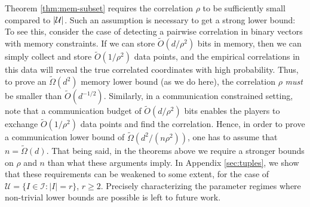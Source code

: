 \begin{remark}\label{remark:rhosmall}
Theorem \ref{thm:mem-subset} requires the correlation $\rho$ to be sufficiently small compared to $|\mathcal{U}|$. Such an assumption is necessary to get a strong lower bound: To see this, consider the case of detecting a pairwise correlation in binary vectors with memory constraints. If we can store $\tilde{O}(d/\rho^2)$ bits in memory, then we can simply collect and store $\tilde{O}(1/\rho^2)$ 
data points, and the empirical correlations in this data will reveal the true 
correlated coordinates with high probability. Thus, to prove an 
$\tilde{\Omega}(d^2)$ memory lower bound (as we do here), the correlation $\rho$ \emph{must} be smaller than $\tilde{O}(d^{-1/2})$.
Similarly, in a communication constrained setting, note that a communication budget of $\tilde{O}(d/\rho^2)$ bits enables the players to exchange $\tilde{O}(1/\rho^2)$ data points and find the correlation. Hence, in order to prove a communication lower bound of $\tilde{\Omega}\left(d^2/\left(n \rho^2\right)\right)$, one has to assume that $n = \tilde\Omega(d)$.
That being said, in the theorems above we require a stronger bounds on $\rho$ and $n$ than what these arguments imply. In Appendix \ref{sec:tuples}, we show that these requirements can be weakened to some extent,  for the case of $\mathcal{U} = \{ I \in \mathcal{I} \colon \lvert I \rvert = r\}$, $r\geq 2$. Precisely characterizing the parameter regimes where non-trivial lower bounds are possible is left to future work. 
\end{remark}



